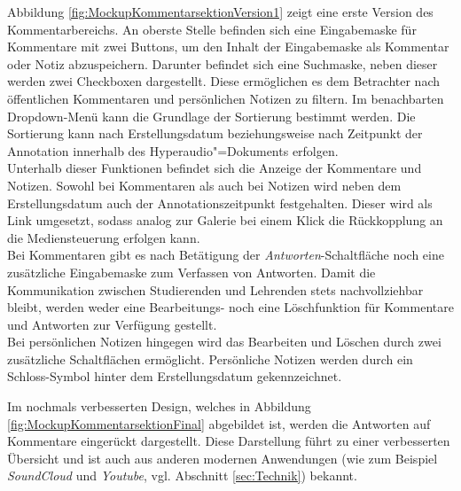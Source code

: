 \FloatBarrier

Abbildung \ref{fig:MockupKommentarsektionVersion1} zeigt eine erste Version des Kommentarbereichs. An oberste Stelle befinden sich eine Eingabemaske für Kommentare mit zwei Buttons, um den Inhalt der Eingabemaske als Kommentar oder Notiz abzuspeichern. Darunter befindet sich eine Suchmaske, neben dieser werden zwei Checkboxen dargestellt. Diese ermöglichen es dem Betrachter nach öffentlichen Kommentaren und persönlichen Notizen zu filtern. Im benachbarten Dropdown-Menü kann die Grundlage der Sortierung bestimmt werden. Die Sortierung kann nach Erstellungsdatum beziehungsweise nach Zeitpunkt der Annotation innerhalb des Hyperaudio"=Dokuments erfolgen.\\
Unterhalb dieser Funktionen befindet sich die Anzeige der Kommentare und Notizen. Sowohl bei Kommentaren als auch bei Notizen wird neben dem Erstellungsdatum auch der Annotationszeitpunkt festgehalten. Dieser wird als Link umgesetzt, sodass analog zur Galerie bei einem Klick die Rückkopplung an die Mediensteuerung erfolgen kann.\\
Bei Kommentaren gibt es nach Betätigung der \textit{Antworten}-Schaltfläche noch eine zusätzliche Eingabemaske zum Verfassen von Antworten. Damit die Kommunikation zwischen Studierenden und Lehrenden stets nachvollziehbar bleibt, werden weder eine Bearbeitungs- noch eine Löschfunktion für Kommentare und Antworten zur Verfügung gestellt.\\
Bei persönlichen Notizen hingegen wird das Bearbeiten und Löschen durch zwei zusätzliche Schaltflächen ermöglicht. Persönliche Notizen werden durch ein Schloss-Symbol hinter dem Erstellungsdatum gekennzeichnet.

Im nochmals verbesserten Design, welches in Abbildung \ref{fig:MockupKommentarsektionFinal} abgebildet ist, werden die Antworten auf Kommentare eingerückt dargestellt. Diese Darstellung führt zu einer verbesserten Übersicht und ist auch aus anderen modernen Anwendungen (wie zum Beispiel \textit{SoundCloud} und \textit{Youtube}, vgl. Abschnitt \ref{sec:Technik}) bekannt.

